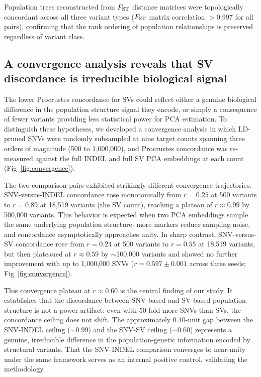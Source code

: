 Population trees reconstructed from $F_\mathrm{ST}$ distance matrices were topologically concordant across all three variant types ($F_\mathrm{ST}$ matrix correlation $> 0.997$ for all pairs), confirming that the rank ordering of population relationships is preserved regardless of variant class.

\subsection*{A convergence analysis reveals that SV discordance is irreducible biological signal}

The lower Procrustes concordance for SVs could reflect either a genuine biological difference in the population structure signal they encode, or simply a consequence of fewer variants providing less statistical power for PCA estimation. To distinguish these hypotheses, we developed a convergence analysis in which LD-pruned SNVs were randomly subsampled at nine target counts spanning three orders of magnitude (500 to 1,000,000), and Procrustes concordance was re-measured against the full INDEL and full SV PCA embeddings at each count (Fig~\ref{fig:convergence}).

The two comparison pairs exhibited strikingly different convergence trajectories. SNV-versus-INDEL concordance rose monotonically from $r = 0.25$ at 500 variants to $r = 0.89$ at 18,519 variants (the SV count), reaching a plateau of $r \approx 0.99$ by 500,000 variants. This behavior is expected when two PCA embeddings sample the same underlying population structure: more markers reduce sampling noise, and concordance asymptotically approaches unity. In sharp contrast, SNV-versus-SV concordance rose from $r = 0.24$ at 500 variants to $r = 0.55$ at 18,519 variants, but then plateaued at $r \approx 0.59$ by $\sim$100,000 variants and showed no further improvement with up to 1,000,000 SNVs ($r = 0.597 \pm 0.001$ across three seeds; Fig~\ref{fig:convergence}).

This convergence plateau at $r \approx 0.60$ is the central finding of our study. It establishes that the discordance between SNV-based and SV-based population structure is not a power artifact: even with 50-fold more SNVs than SVs, the concordance ceiling does not shift. The approximately 0.40-unit gap between the SNV-INDEL ceiling ($\sim$0.99) and the SNV-SV ceiling ($\sim$0.60) represents a genuine, irreducible difference in the population-genetic information encoded by structural variants. That the SNV-INDEL comparison converges to near-unity under the same framework serves as an internal positive control, validating the methodology.

